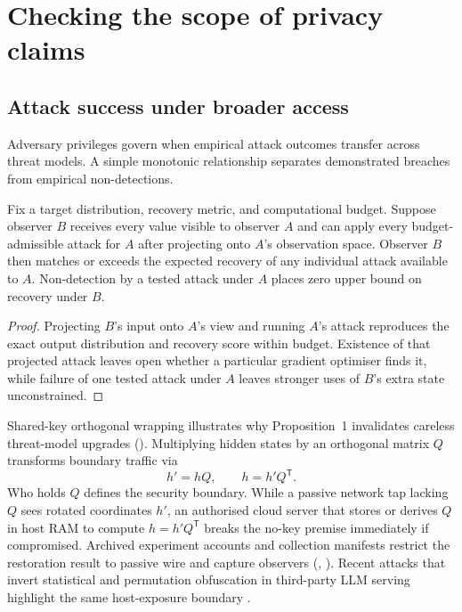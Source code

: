 \section{Checking the scope of privacy claims}
\label{sec:scopechecks}

\subsection{Attack success under broader access}

Adversary privileges govern when empirical attack outcomes transfer across
threat models. A simple monotonic relationship separates demonstrated
breaches from empirical non-detections.

\begin{samepage}
\begin{proposition}
Fix a target distribution, recovery metric, and computational budget.
Suppose observer $B$ receives every value visible to observer $A$ and can
apply every budget-admissible attack for $A$ after projecting onto $A$'s
observation space. Observer $B$ then matches or exceeds the expected
recovery of any individual attack available to $A$. Non-detection by a
tested attack under $A$ places zero upper bound on recovery under $B$.
\end{proposition}
\begin{proof}
Projecting $B$'s input onto $A$'s view and running $A$'s attack reproduces
the exact output distribution and recovery score within budget. Existence
of that projected attack leaves open whether a particular gradient
optimiser finds it, while failure of one tested attack under $A$ leaves
stronger uses of $B$'s extra state unconstrained.
\end{proof}
\end{samepage}

Shared-key orthogonal wrapping illustrates why Proposition~1 invalidates
careless threat-model upgrades (). Multiplying hidden states
by an orthogonal matrix $Q$ transforms boundary traffic via
\begin{equation}
 h'=hQ,\qquad h=h'Q^{\mathsf T}.
 \label{eq:rotation}
\end{equation}
Who holds $Q$ defines the security boundary. While a passive network tap
lacking $Q$ sees rotated coordinates $h'$, an authorised cloud server that
stores or derives $Q$ in host RAM to compute $h=h'Q^{\mathsf T}$ breaks the
no-key premise immediately if compromised. Archived experiment accounts and
collection manifests restrict the restoration result to passive wire and
capture observers (, ). Recent attacks that
invert statistical and permutation obfuscation in third-party LLM serving
highlight the same host-exposure boundary \cite{permattack2025}.

